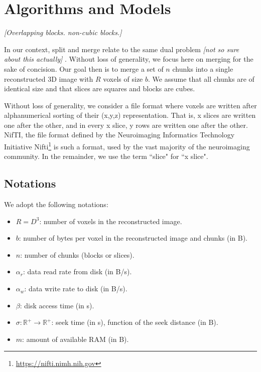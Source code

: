 \documentclass[10pt, conference, compsocconf]{IEEEtran}
\newcommand{\todo}[1]{
  \color{red}\emph{[#1]}
  \color{black}
}
\begin{document}
\section{Algorithms and Models}
\label{sec:algos}

\todo{Overlapping blocks. non-cubic blocks.}

In our context, split and merge relate to the same dual
problem \todo{not so sure about this actually}. Without loss of
generality, we focus here on merging for the sake of concision. Our
goal then is to merge a set of $n$ chunks into a single reconstructed
3D image with $R$ voxels of size $b$. We assume that all chunks are of
identical size and that slices are squares and blocks are cubes.

Without loss of generality, we consider a file format where voxels are
written after alphanumerical sorting of their (x,y,z)
representation. That is, x slices are written one after the other, and
in every x slice, y rows are written one after the other. NifTI, the
file format defined by the Neuroimaging Informatics Technology
Initiative Nifti\footnote{\url{https://nifti.nimh.nih.gov}} is such a
format, used by the vast majority of the neuroimaging community. In
the remainder, we use the term ``slice" for ``x slice".

\subsection{Notations}

We adopt the following notations:
\begin{itemize}
\item $R=D^3$: number of voxels in the reconstructed image.
\item $b$: number of bytes per voxel in the reconstructed image and chunks (in B).
\item $n$: number of chunks (blocks or slices).
\item $\alpha_r$: data read rate from disk (in B/s).
\item $\alpha_w$: data write rate to disk (in B/s).
\item $\beta$: disk access time (in s).
\item $\sigma: \mathbb{R}^{+} \rightarrow \mathbb{R}^{+}$: seek time (in s), function of the seek
  distance (in B).
\item $m$: amount of available RAM (in B).
\end{itemize}
\end{document}
